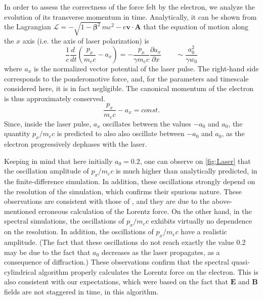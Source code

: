 \documentclass[1p,times]{elsarticle}
\renewcommand{\vec}[1]{\boldsymbol{#1}}
\begin{document}
In order to assess the correctness of the force felt by the electron,
we analyze the evolution of its transverse momentum in
time. Analytically, it can be shown from the Lagrangian 
$\mathcal{L} = - \sqrt{1-\vec{\beta}^2} \,mc^2 - e \vec{v} \cdot
\vec{A}$ that the equation of motion along the $x$ axis (i.e. the axis of laser polarization) is 
\begin{equation} \frac{1}{c}\frac{d \,}{dt} \left( \frac{p_x}{m_e c} - a_x \right) =
 - \frac{p_x}{\gamma m_e c}\frac{\partial a_x}{\partial x} \qquad \sim
\frac{a_0^2}{\gamma w_0} \end{equation}
\noindent where $a_x$ is the normalized vector potential of the laser
pulse. The right-hand side corresponds to the ponderomotive force, and,
for the parameters and timescale considered here, it is in fact
negligible. The canonical momentum of the
electron is thus approximately conserved.
\begin{equation} \frac{p_x}{m_e c} - a_x  = const. \end{equation}
\noindent Since, inside the laser pulse, $a_x$ oscillates between the values $-a_0$ and $a_0$,
the quantity $p_x/m_e c$ is predicted to also also oscillate
between $-a_0$ and $a_0$, as the electron progressively
dephases with the laser. 

Keeping in mind that here initially $a_0=0.2$, one can observe on
\cref{fig:Laser} that the oscillation amplitude of $p_x/m_e c$
is much higher than analytically predicted, in the finite-difference
simulation. In addition, these oscillations strongly depend on the
resolution of the simulation, which confirms their spurious nature. These
observations are consistent with those of \citep{LehePRSTAB2014}, and
they are due to the above-mentioned erroneous calculation of the
Lorentz force. On the other hand, in the spectral simulations, the
oscillations of $p_x/m_e c$ exhibits virtually no dependence on the
resolution. In addition, the oscillations of $p_x/m_e c$ have a realistic
amplitude. (The fact that these oscillations do not reach exactly the
value 0.2 may be due to the fact that $a_0$ decreases as the laser
propagates, as a consequence of diffraction.) These observations
confirm that the spectral quasi-cylindrical algorithm properly calculates
the Lorentz force on the electron. This is also consistent with our
expectations, which were based on the fact that $\vec{E}$ and
$\vec{B}$ fields are not staggered in time, in this algorithm.
\end{document}
